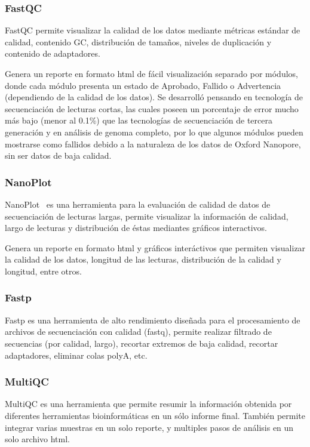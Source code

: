 \subsubsection{FastQC}
FastQC\cite{andrews2010fastqc} permite visualizar la calidad de los datos mediante métricas estándar de calidad, contenido GC, distribución de tamaños, niveles de duplicación  y contenido de adaptadores.


Genera un reporte en formato html de fácil visualización separado por módulos, donde cada módulo presenta un estado de Aprobado, Fallido o Advertencia (dependiendo de la calidad de los datos). 
Se desarrolló pensando en tecnología de secuenciación de lecturas cortas, las cuales poseen un porcentaje de error mucho más bajo (menor al 0.1\%) que las tecnologías de secuenciación de tercera generación y en análisis de genoma completo, por lo que algunos módulos pueden mostrarse como fallidos debido a la naturaleza de los datos de Oxford Nanopore, sin ser datos de baja calidad.
\subsubsection{NanoPlot}
NanoPlot~\cite{10.1093/bioinformatics/btad311} es una herramienta para la evaluación de calidad de datos de secuenciación de lecturas largas, permite visualizar la información de calidad, largo de lecturas y distribución de éstas mediantes gráficos interactivos.

Genera un reporte en formato html y gráficos interáctivos que permiten visualizar la calidad de los datos, longitud de las lecturas, distribución de la calidad y longitud, entre otros.
\subsubsection{Fastp}

Fastp\cite{chen2018fastp} es una herramienta de alto rendimiento diseñada para el procesamiento de archivos de secuenciación con calidad (fastq), permite realizar filtrado de secuencias (por calidad, largo), recortar extremos de baja calidad, recortar adaptadores, eliminar colas polyA, etc.
\subsubsection{MultiQC}
MultiQC \cite{ewels2016multiqc} es una herramienta que permite resumir la información obtenida por diferentes herramientas bioinformáticas en un sólo informe final. 
También permite integrar varias muestras en un solo reporte, y multiples pasos de análisis en un solo archivo html.

